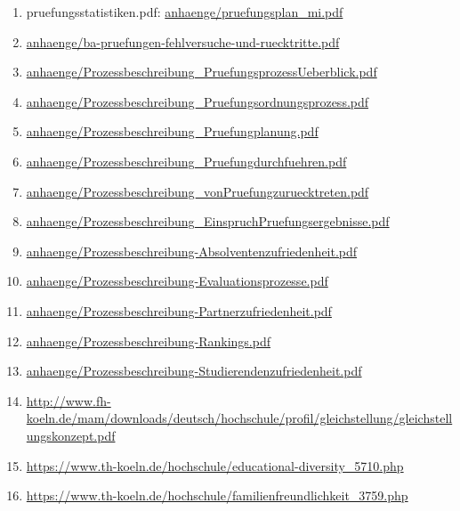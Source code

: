\documentclass[BCOR12mm,DIV11,titlepage,a4paper,oneside,10pt]{scrbook}
\begin{document}
\begin{sloppypar}
\begin{flushleft}
\begin{enumerate}
\item{pruefungsstatistiken.pdf: \href{anhaenge/pruefungsplan\_mi.pdf}{anhaenge/pruefungsplan\_mi.pdf} } 
\item{\href{anhaenge/ba-pruefungen-fehlversuche-und-ruecktritte.pdf}{anhaenge/ba-pruefungen-fehlversuche-und-ruecktritte.pdf} } 
\item{\href{anhaenge/Prozessbeschreibung\_PruefungsprozessUeberblick.pdf}{anhaenge/Prozessbeschreibung\_PruefungsprozessUeberblick.pdf} } 
\item{\href{anhaenge/Prozessbeschreibung\_Pruefungsordnungsprozess.pdf}{anhaenge/Prozessbeschreibung\_Pruefungsordnungsprozess.pdf} } 
\item{\href{anhaenge/Prozessbeschreibung\_Pruefungplanung.pdf}{anhaenge/Prozessbeschreibung\_Pruefungplanung.pdf} } 
\item{\href{anhaenge/Prozessbeschreibung\_Pruefungdurchfuehren.pdf}{anhaenge/Prozessbeschreibung\_Pruefungdurchfuehren.pdf} } 
\item{\href{anhaenge/Prozessbeschreibung\_vonPruefungzuruecktreten.pdf}{anhaenge/Prozessbeschreibung\_vonPruefungzuruecktreten.pdf} } 
\item{\href{anhaenge/Prozessbeschreibung\_EinspruchPruefungsergebnisse.pdf}{anhaenge/Prozessbeschreibung\_EinspruchPruefungsergebnisse.pdf} } 
\item{\href{anhaenge/Prozessbeschreibung-Absolventenzufriedenheit.pdf}{anhaenge/Prozessbeschreibung-Absolventenzufriedenheit.pdf} } 
\item{\href{anhaenge/Prozessbeschreibung-Evaluationsprozesse.pdf}{anhaenge/Prozessbeschreibung-Evaluationsprozesse.pdf} } 
\item{\href{anhaenge/Prozessbeschreibung-Partnerzufriedenheit.pdf}{anhaenge/Prozessbeschreibung-Partnerzufriedenheit.pdf} } 
\item{\href{anhaenge/Prozessbeschreibung-Rankings.pdf}{anhaenge/Prozessbeschreibung-Rankings.pdf} } 
\item{\href{anhaenge/Prozessbeschreibung-Studierendenzufriedenheit.pdf}{anhaenge/Prozessbeschreibung-Studierendenzufriedenheit.pdf} } 
\item{\href{http://www.fh-koeln.de/mam/downloads/deutsch/hochschule/profil/gleichstellung/gleichstellungskonzept.pdf}{http://www.fh-koeln.de/mam/downloads/deutsch/hochschule/profil/gleichstellung/gleichstellungskonzept.pdf} } 
\item{\href{https://www.th-koeln.de/hochschule/educational-diversity\_5710.php}{https://www.th-koeln.de/hochschule/educational-diversity\_5710.php} } 
\item{\href{https://www.th-koeln.de/hochschule/familienfreundlichkeit\_3759.php}{https://www.th-koeln.de/hochschule/familienfreundlichkeit\_3759.php} } 

\end{enumerate}

\end{flushleft}
\end{sloppypar}

\backmatter
\end{document}
